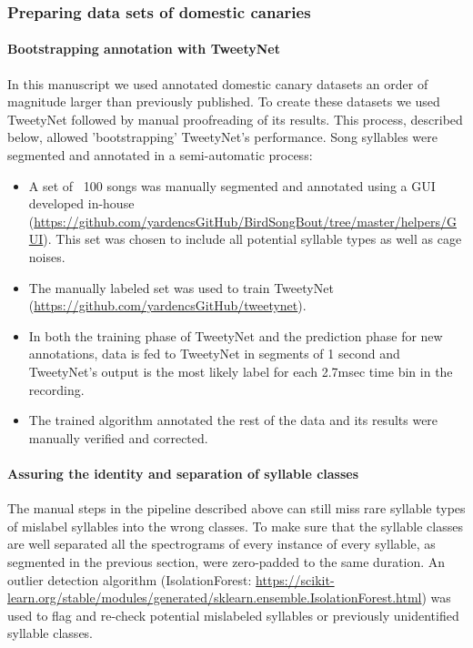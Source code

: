 \documentclass[10pt,letterpaper]{article}
\begin{document}
\subsubsection*{Preparing data sets of domestic canaries}
\paragraph{Bootstrapping annotation with TweetyNet}
In this manuscript we used annotated domestic canary datasets an order of magnitude larger than previously published. To create these datasets we used TweetyNet followed by manual proofreading of its results. This process, described below, allowed 'bootstrapping' TweetyNet's performance.
\vspace{2mm}
\newline
Song syllables were segmented and annotated in a semi-automatic process:
\begin{itemize}
    \item A set of ~100 songs was manually segmented and annotated using a GUI developed in-house (\url{https://github.com/yardencsGitHub/BirdSongBout/tree/master/helpers/GUI}). This set was chosen to include all potential syllable types as well as cage noises.
    \item The manually labeled set was used to train TweetyNet (\url{https://github.com/yardencsGitHub/tweetynet}).
    \item In both the training phase of TweetyNet and the prediction phase for new annotations, data is fed to TweetyNet in segments of 1 second and TweetyNet’s output is the most likely label for each 2.7msec time bin in the recording.
    \item The trained algorithm annotated the rest of the data and its results were manually verified and corrected.
\end{itemize}
\paragraph{Assuring the identity and separation of syllable classes}
The manual steps in the pipeline described above can still miss rare syllable types of mislabel syllables into the wrong classes. To make sure that the syllable classes are well separated all the spectrograms of every instance of every syllable, as segmented in the previous section, were zero-padded to the same duration. An outlier detection algorithm (IsolationForest: \url{https://scikit-learn.org/stable/modules/generated/sklearn.ensemble.IsolationForest.html}) was used to flag and re-check potential mislabeled syllables or previously unidentified syllable classes.
\end{document}
